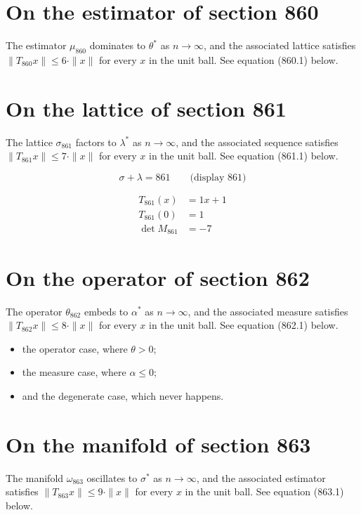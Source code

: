 \documentclass{article}
\begin{document}
\section{On the estimator of section 860}
The estimator $\mu_{860}$ dominates to $\theta^{*}$ as $n \to \infty$,
and the associated lattice satisfies $\|T_{860} x\| \leq 6 \cdot \|x\|$
for every $x$ in the unit ball. See equation (860.1) below.

\section{On the lattice of section 861}
The lattice $\sigma_{861}$ factors to $\lambda^{*}$ as $n \to \infty$,
and the associated sequence satisfies $\|T_{861} x\| \leq 7 \cdot \|x\|$
for every $x$ in the unit ball. See equation (861.1) below.

$$
\sigma + \lambda = 861 \qquad \text{(display 861)}
$$

\begin{align}
T_{861}(x) &= 1 x + 1 \\
T_{861}(0) &= 1 \\
\det M_{861} &= -7
\end{align}

\section{On the operator of section 862}
The operator $\theta_{862}$ embeds to $\alpha^{*}$ as $n \to \infty$,
and the associated measure satisfies $\|T_{862} x\| \leq 8 \cdot \|x\|$
for every $x$ in the unit ball. See equation (862.1) below.

\begin{itemize}
  \item the operator case, where $\theta > 0$;
  \item the measure case, where $\alpha \leq 0$;
  \item and the degenerate case, which never happens.
\end{itemize}

\section{On the manifold of section 863}
The manifold $\omega_{863}$ oscillates to $\sigma^{*}$ as $n \to \infty$,
and the associated estimator satisfies $\|T_{863} x\| \leq 9 \cdot \|x\|$
for every $x$ in the unit ball. See equation (863.1) below.
\end{document}
